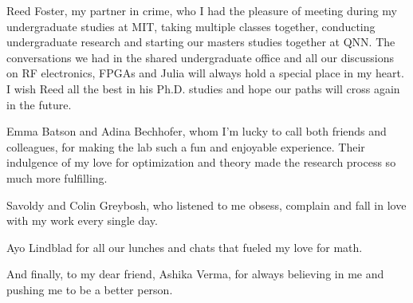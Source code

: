 Reed Foster, my partner in crime, who I had the pleasure of meeting during my undergraduate studies at MIT, taking multiple classes together, conducting undergraduate research and starting our masters studies together at QNN. The conversations we had in the shared undergraduate office and all our discussions on RF electronics, FPGAs and Julia will always hold a special place in my heart. I wish Reed all the best in his Ph.D. studies and hope our paths will cross again in the future.

Emma Batson and Adina Bechhofer, whom I’m lucky to call both friends and colleagues, for making the lab such a fun and enjoyable experience. Their indulgence of my love for optimization and theory made the research process so much more fulfilling.

Savoldy and Colin Greybosh, who listened to me obsess, complain and fall in love with my work every single day. 

Ayo Lindblad for all our lunches and chats that fueled my love for math.

And finally, to my dear friend, Ashika Verma, for always believing in me and pushing me to be a better person. 

